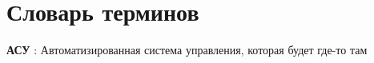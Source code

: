 \chapter*{Словарь терминов}             %

\textbf{АСУ} : Автоматизированная система управления, которая будет где-то там